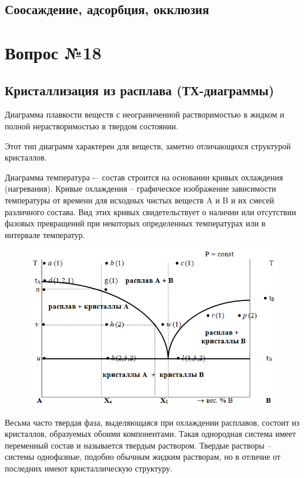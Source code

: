 \documentclass[14pt,a4paper]{scrartcl}
\begin{document}
\subsection*{Соосаждение, адсорбция, окклюзия}




\section*{Вопрос №18}
\subsection*{Кристаллизация из расплава (ТХ-диаграммы)}
Диаграмма плавкости веществ с неограниченной растворимостью в жидком и полной нерастворимостью в твердом состоянии.

Этот тип диаграмм характерен для веществ, заметно отличающихся структурой кристаллов.

Диаграмма температура -– состав строится на основании кривых охлаждения (нагревания). Кривые охлаждения – графическое изображение зависимости температуры от времени для исходных чистых веществ A и B и их смесей различного состава. Вид этих кривых свидетельствует о наличии или отсутствии фазовых превращений при некоторых определенных температурах или в интервале температур. 
\begin{figure}[H]
\centering
\includegraphics[scale=.45]{cristallization-diagram.png}
\caption{}
\label{}
\end{figure}

Весьма часто твердая фаза, выделяющаяся при охлаждении расплавов, состоит из кристаллов, образуемых обоими компонентами. Такая однородная система имеет переменный состав и называется твердым раствором. Твердые растворы – системы однофазные, подобно обычным жидким растворам, но в отличие от последних имеют кристаллическую структуру.
\end{document}
